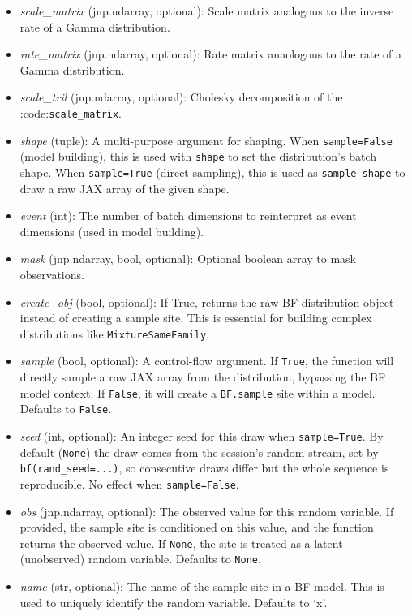 \documentclass[
  letterpaper,
  DIV=11,
  numbers=noendperiod]{scrartcl}
\begin{document}
\begin{itemize}
\item
  \emph{scale\_matrix} (jnp.ndarray, optional): Scale matrix analogous
  to the inverse rate of a Gamma distribution.
\item
  \emph{rate\_matrix} (jnp.ndarray, optional): Rate matrix anaologous to
  the rate of a Gamma distribution.
\item
  \emph{scale\_tril} (jnp.ndarray, optional): Cholesky decomposition of
  the :code:\texttt{scale\_matrix}.
\item
  \emph{shape} (tuple): A multi-purpose argument for shaping. When
  \texttt{sample=False} (model building), this is used with
  \texttt{shape} to set the distribution's batch shape. When
  \texttt{sample=True} (direct sampling), this is used as
  \texttt{sample\_shape} to draw a raw JAX array of the given shape.
\item
  \emph{event} (int): The number of batch dimensions to reinterpret as
  event dimensions (used in model building).
\item
  \emph{mask} (jnp.ndarray, bool, optional): Optional boolean array to
  mask observations.
\item
  \emph{create\_obj} (bool, optional): If True, returns the raw BF
  distribution object instead of creating a sample site. This is
  essential for building complex distributions like
  \texttt{MixtureSameFamily}.
\item
  \emph{sample} (bool, optional): A control-flow argument. If
  \texttt{True}, the function will directly sample a raw JAX array from
  the distribution, bypassing the BF model context. If \texttt{False},
  it will create a \texttt{BF.sample} site within a model. Defaults to
  \texttt{False}.
\item
  \emph{seed} (int, optional): An integer seed for this draw when
  \texttt{sample=True}. By default (\texttt{None}) the draw comes from
  the session's random stream, set by \texttt{bf(rand\_seed=...)}, so
  consecutive draws differ but the whole sequence is reproducible. No
  effect when \texttt{sample=False}.
\item
  \emph{obs} (jnp.ndarray, optional): The observed value for this random
  variable. If provided, the sample site is conditioned on this value,
  and the function returns the observed value. If \texttt{None}, the
  site is treated as a latent (unobserved) random variable. Defaults to
  \texttt{None}.
\item
  \emph{name} (str, optional): The name of the sample site in a BF
  model. This is used to uniquely identify the random variable. Defaults
  to `x'.
\end{itemize}
\end{document}
